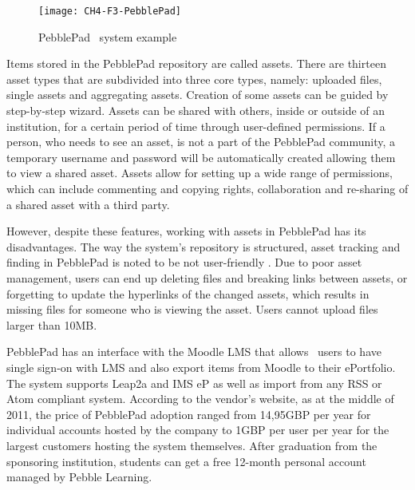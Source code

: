 \begin{figure}[htb]
\centering
\texttt{[image: CH4-F3-PebblePad]}
\caption[PebblePad \ep~system example]{PebblePad \ep~system example
\citep{PebbleLearningLtd}}
\label{fig:ppep}
\end{figure}

Items stored in the PebblePad repository are called assets. There are thirteen
asset types that are subdivided into three core types, namely: uploaded files,
single assets and aggregating assets. Creation of some assets can be guided by
step-by-step wizard. Assets can be shared with others, inside or outside of an
institution, for a certain period of time through user-defined permissions. If a
person, who needs to see an asset, is not a part of the PebblePad community, a
temporary username and password will be automatically created allowing them to
view a shared asset. Assets allow for setting up a wide range of permissions,
which can include commenting and copying rights, collaboration and re-sharing
of a shared asset with a third party.

However, despite these features, working with assets in PebblePad has its
disadvantages. The way the system's repository is structured, asset tracking and
finding in PebblePad is noted to be not user-friendly \citep{Overton2009}. Due
to poor asset management, users can end up deleting files and breaking links
between assets, or forgetting to update the hyperlinks of the changed assets,
which results in missing files for someone who is viewing the asset. Users
cannot upload files larger than 10MB.

PebblePad has an interface with the Moodle LMS that allows \ep~users to have
single sign-on with LMS and also export items from Moodle to their ePortfolio.
The system supports Leap2a and IMS eP as well as import from any RSS or Atom
compliant system. According to the vendor's website, as at the middle of 2011,
the price of PebblePad adoption ranged from 14,95GBP per year for individual
accounts hosted by the company to 1GBP per user per year for the largest
customers hosting the system themselves. After graduation from the sponsoring
institution, students can get a free 12-month personal account managed by Pebble
Learning.

